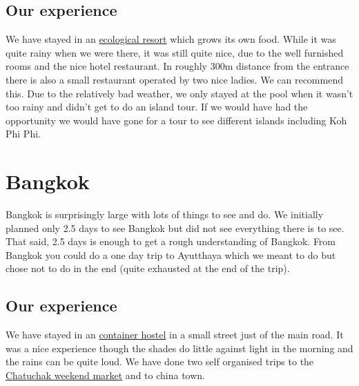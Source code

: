 \documentclass[11pt,a4paper,sans,english]{article}
\begin{document}
\subsection{Our experience}
We have stayed in an
\href{https://www.booking.com/hotel/th/anana-ecological-resort-krabi.html?checkin=2023-07-16&req_children=0&from_sn=android&type=total&no_rooms=1&checkout=2023-07-20&keep_landing=1&sb_price_type=total&aid=2090015&sid=acf2fc5ef45a08118dd3eb8ae140615c&activeTab=main&req_adults=2&label=Share-Do7gHL\%25401684087118-vtudyES\%401685808487&auth_success=1&group_adults=2&dist=0&group_children=0&room1=A\%2CA#_}{ecological resort} which grows its own food. While it was quite rainy when we were there, it was still quite nice, due to the well furnished rooms and the nice hotel restaurant. In roughly 300m distance from the entrance there is also a small restaurant operated by two nice ladies. We can recommend this. Due to the relatively bad weather, we only stayed at the pool when it wasn't too rainy and didn't get to do an island tour. If we would have had the opportunity we would have gone for a tour to see different islands including Koh Phi Phi.

\section{Bangkok}
Bangkok is surprisingly large with lots of things to see and do. We initially planned only 2.5 days to see Bangkok but did not see everything there is to see. That said, 2.5 days is enough to get a rough understanding of Bangkok.
From Bangkok you could do a one day trip to Ayutthaya which we meant to do but chose not to do in the end (quite exhausted at the end of the trip).

\subsection{Our experience}
We have stayed in an
\href{https://www.booking.com/hotel/th/the-yard-hostel.html?aid=2090015&label=Share-Do7gHL\%25401684087118-vtudyES\%401685808487&sid=ef02e173088c39a4d4cfe3124886fffe&all_sr_blocks=131612903_362126892_0_1_0\%2C131612903_362126892_0_1_0\%2C131612903_362126892_0_1_0\%2C131612903_362126892_0_1_0;checkin=2023-10-21;checkout=2023-10-22;dest_id=-3414440;dest_type=city;dist=0;group_adults=4;group_children=0;hapos=1;highlighted_blocks=131612903_362126892_0_1_0\%2C131612903_362126892_0_1_0\%2C131612903_362126892_0_1_0\%2C131612903_362126892_0_1_0;hpos=1;matching_block_id=131612903_362126892_0_1_0;no_rooms=2;req_adults=4;req_children=0;room1=A\%2CA;room2=A\%2CA;sb_price_type=total;sr_order=popularity;sr_pri_blocks=131612903_362126892_0_1_0__46811\%2C131612903_362126892_0_1_0__46811\%2C131612903_362126892_0_1_0__46811\%2C131612903_362126892_0_1_0__46811;srepoch=1691081632;srpvid=787b76cd8ab90357;type=total;ucfs=1&#hotelTmpl}{container hostel} in a small street just of the main road. It was a nice experience though the shades do little against light in the morning and the rains can be quite loud.
We have done two self organised trips to the \href{https://www.chatuchakmarket.org/}{Chatuchak weekend market} and to china town.
\end{document}
